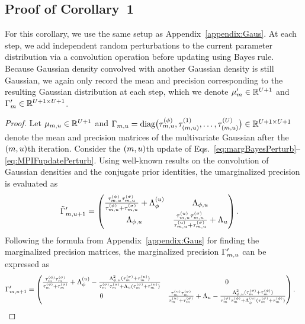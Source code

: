   \subsection{Proof of Corollary~1}\label{appendix:perturbed} 
 
  For this corollary, we use the same setup as Appendix~\ref{appendix:Gaus}. 
  At each step, we add independent random perturbations to the current parameter distribution via a convolution operation before updating using Bayes rule. 
  Because Gaussian density convolved with another Gaussian density is still Gaussian, we again only record the mean and precision corresponding to the resulting Gaussian distribution at each step, which we denote $\mu'_{m} \in \mathbb{R}^{U+1}$ and $\Gamma'_{m} \in \mathbb{R}^{U+1\times U+1}$. 

\begin{proof}
Let $\mu_{m, u} \in \mathbb{R}^{U+1}$ and
$\Gamma_{m, u} = \text{diag}
  \big(
    \tau_{m, u}^{(\phi)}, \tau_{(m, u)}^{(1)}, \ldots, \tau_{(m, u)}^{(U)}
  \big)
  \in \mathbb{R}^{U+1\times U+1}$
denote the mean and precision matrices of the multivariate Gaussian after the $(m, u)$th iteration. 
Consider the $(m, u)$th update of Eqs.~\ref{eq:margBayesPerturb}--\ref{eq:MPIFupdatePerturb}. 
Using well-known results on the convolution of Gaussian densities and the conjugate prior identities, the umarginalized precision is evaluated as
\begin{align*}
\tilde{\Gamma}'_{m, u+1} &= \begin{pmatrix} \frac{\tau_{m, u}^{(\phi)}\tau_{m, u}^{(\sigma)}}{\tau_{m, u}^{(\phi)} + \tau_{m, u}^{(\sigma)}} + \Lambda^{(u)}_\phi & \Lambda_{\phi, u} \\ \Lambda_{\phi, u} & \frac{\tau_{m, u}^{(u)}\tau_{m, u}^{(\sigma)}}{\tau_{m, u}^{(u)} + \tau_{m, u}^{(\sigma)}} + \Lambda_u\end{pmatrix}.
   \end{align*}
   Following the formula from Appendix~\ref{appendix:Gaus} for finding the marginalized precision matrices, the marginalized precision $\Gamma'_{m, u}$ can be expressed as
     \begin{align*}
   \Gamma'_{\nmif, \unit+1} &= \begin{pmatrix} \frac{\tau^{(\phi)}_\nmif\tau^{(\sigma)}_\nmif}{\tau^{(\phi)}_\nmif + \tau^{(\sigma)}_\nmif} + \Lambda^{(\unit)}_{\phi} - \frac{\Lambda^2_{\phi, u}(\tau^{(\sigma)}_\nmif + \tau^{(u)}_\nmif)}{\tau^{(\sigma)}_\nmif\tau^{(\unit)}_\nmif + \Lambda_u(\tau^{(\sigma)}_\nmif + \tau^{(u)}_\nmif)} & 0 \\ 0 & \frac{\tau^{(u)}_\nmif\tau^{(\sigma)}_\nmif}{\tau^{(u)}_\nmif + \tau^{(\sigma)}_\nmif} + \Lambda_{u} - \frac{\Lambda^2_{\phi, u}(\tau^{(\sigma)}_\nmif + \tau^{(\phi)}_\nmif)}{\tau^{(\sigma)}_\nmif\tau^{(\phi)}_\nmif + \Lambda^{(u)}_\phi(\tau^{(\sigma)}_\nmif + \tau^{(\phi)}_\nmif)}\end{pmatrix}.

\end{align*}
\end{proof}

